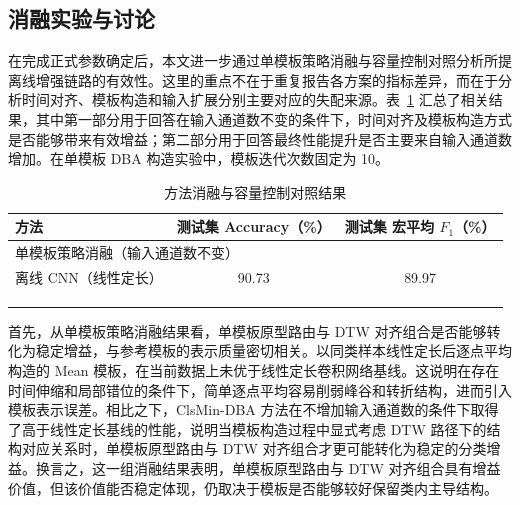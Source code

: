 \documentclass{xdupgthesis}
\providecommand{\FloatBarrier}{}
\begin{document}
\FloatBarrier

\subsection{消融实验与讨论}
\label{subsec:ch3_ablation}

在完成正式参数确定后，本文进一步通过单模板策略消融与容量控制对照分析所提离线增强链路的有效性。这里的重点不在于重复报告各方案的指标差异，而在于分析时间对齐、模板构造和输入扩展分别主要对应的失配来源。表~\ref{tab:ch3_ablation_methods} 汇总了相关结果，其中第一部分用于回答在输入通道数不变的条件下，时间对齐及模板构造方式是否能够带来有效增益；第二部分用于回答最终性能提升是否主要来自输入通道数增加。在单模板 DBA 构造实验中，模板迭代次数固定为 10。

\begin{table}[!htbp]
\centering
\small
\caption{方法消融与容量控制对照结果}
\label{tab:ch3_ablation_methods}
\renewcommand{\arraystretch}{1.15}
\setlength{\tabcolsep}{6pt}
\begin{tabular}{lcc}
    \hline
    方法 & 测试集 Accuracy（\%） & 测试集 宏平均 $F_1$（\%） \\
    \hline
    \multicolumn{3}{l}{单模板策略消融（输入通道数不变）}\\
    \addlinespace[2pt]
    离线 CNN（线性定长） & 90.73 & 89.97 \\
    \\
    \addlinespace[3pt]
    \multicolumn{3}{l}{容量控制对照}\\
    \addlinespace[2pt]
    \\
    \hline
\end{tabular}
\end{table}

首先，从单模板策略消融结果看，单模板原型路由与 DTW 对齐组合是否能够转化为稳定增益，与参考模板的表示质量密切相关。以同类样本线性定长后逐点平均构造的 Mean 模板，在当前数据上未优于线性定长卷积网络基线。这说明在存在时间伸缩和局部错位的条件下，简单逐点平均容易削弱峰谷和转折结构，进而引入模板表示误差。相比之下，ClsMin-DBA 方法在不增加输入通道数的条件下取得了高于线性定长基线的性能，说明当模板构造过程中显式考虑 DTW 路径下的结构对应关系时，单模板原型路由与 DTW 对齐组合才更可能转化为稳定的分类增益。换言之，这一组消融结果表明，单模板原型路由与 DTW 对齐组合具有增益价值，但该价值能否稳定体现，仍取决于模板是否能够较好保留类内主导结构。
\end{document}

